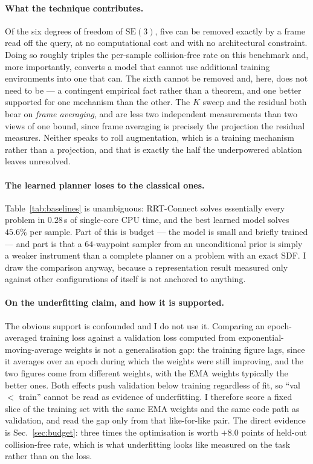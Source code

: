 \documentclass[11pt,a4paper]{article}
\newcommand{\SE}{\mathrm{SE}(3)}
\begin{document}
\paragraph{What the technique contributes.} Of the six degrees of freedom of
$\SE$, five can be removed exactly by a frame read off the query, at no
computational cost and with no architectural constraint. Doing so roughly triples
the per-sample collision-free rate on this benchmark and, more importantly,
converts a model that cannot use additional training environments into one that
can. The sixth cannot be removed and, here, does not need to be --- a contingent
empirical fact rather than a theorem, and one better supported for one mechanism
than the other. The $K$ sweep and the residual both bear on \emph{frame
averaging}, and are less two independent measurements than two views of one
bound, since frame averaging is precisely the projection the residual measures.
Neither speaks to roll augmentation, which is a training mechanism rather than a
projection, and that is exactly the half the underpowered ablation leaves
unresolved.

\paragraph{The learned planner loses to the classical ones.}
Table~\ref{tab:baselines} is unambiguous: RRT-Connect solves essentially every
problem in $0.28$\,s of single-core CPU time, and the best learned model solves
$45.6\%$ per sample. Part of this is budget --- the model is small and briefly
trained --- and part is that a $64$-waypoint sampler from an unconditional prior
is simply a weaker instrument than a complete planner on a problem with an exact
SDF. I draw the comparison anyway, because a representation result measured only
against other configurations of itself is not anchored to anything.

\paragraph{On the underfitting claim, and how it is supported.} The obvious
support is confounded and I do not use it. Comparing an epoch-averaged training
loss against a validation loss computed from exponential-moving-average weights
is not a generalisation gap: the training figure lags, since it averages over an
epoch during which the weights were still improving, and the two figures come
from different weights, with the EMA weights typically the better ones. Both
effects push validation below training regardless of fit, so ``val $<$ train''
cannot be read as evidence of underfitting. I therefore score a fixed slice of
the training set with the same EMA weights and the same code path as validation,
and read the gap only from that like-for-like pair. The direct evidence is
Sec.~\ref{sec:budget}: three times the optimisation is worth $+8.0$ points of
held-out collision-free rate, which is what underfitting looks like measured on
the task rather than on the loss.
\end{document}
